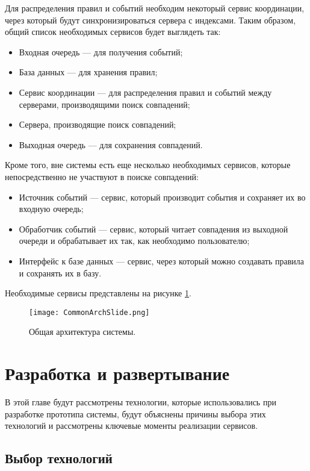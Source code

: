 \documentclass[14pt]{article}
\begin{document}
Для распределения правил и событий необходим некоторый сервис координации, через который будут синхронизироваться сервера с индексами. Таким образом, общий список необходимых сервисов будет выглядеть так:
\begin{itemize}
    \item Входная очередь --- для получения событий;
    \item База данных --- для хранения правил;
    \item Сервис координации --- для распределения правил и событий между серверами, производящими поиск совпадений;
    \item Сервера, производящие поиск совпадений;
    \item Выходная очередь --- для сохранения совпадений.
\end{itemize}
Кроме того, вне системы есть еще несколько необходимых сервисов, которые непосредственно не участвуют в поиске совпадений:
\begin{itemize}
    \item Источник событий --- сервис, который производит события и сохраняет их во входную очередь;
    \item Обработчик событий --- сервис, который читает совпадения из выходной очереди и обрабатывает их так, как необходимо пользователю;
    \item Интерфейс к базе данных --- сервис, через который можно создавать правила и сохранять их в базу.
\end{itemize}
Необходимые сервисы представлены на рисунке \ref{fig:commonArch}.

\begin{figure}[h]
  \centering
    \texttt{[image: CommonArchSlide.png]}
    \caption{Общая архитектура системы.}
    \label{fig:commonArch}
\end{figure}

\section{Разработка и развертывание}
В этой главе будут рассмотрены технологии, которые использовались при разработке прототипа системы, будут объяснены причины выбора этих технологий и рассмотрены ключевые моменты реализации сервисов.

\subsection{Выбор технологий}
\end{document}
